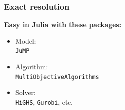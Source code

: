 \documentclass[]{beamer}
\begin{document}
\begin{frame}
  \frametitle{Exact resolution}
\vspace{3mm}

%
%
\textbf{Easy in Julia with these packages:}
\vspace{3mm}
\begin{itemize}
\item Model: \\ \texttt{JuMP}\vspace{1.5mm}
\item Algorithm: \\ \texttt{MultiObjectiveAlgorithms}\vspace{1.5mm}
\item Solver: \\ \texttt{HiGHS}, \texttt{Gurobi}, etc.
\end{itemize}



\end{frame}

% 
%
\end{document}
